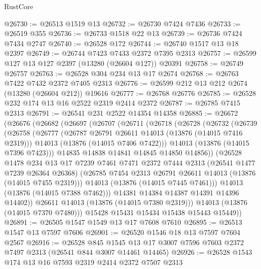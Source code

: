 \begin{lexlean}{RustCore}
\begin{coremodule}
@26730 := @26513 @1519 @13
@26732 := @26730 @7424 @7436
@26733 := @26519 @355
@26736 := @26733 @1518 @22 @13
@26739 := @26736 @7424 @7434 @2747
@26740 := @26528 @172
@26744 := @26740 @1517 @13 @18 @2397
@26749 := @26744 @7423 @7433 @2372 @7395 @2313
@26757 := @26599 @127 @13 @127 @2397 (@13280 (@26604 @127)) @20391
@26758 := @26749 @26757
@26763 := @26528 @304 @234 @13 @17 @2674
@26768 := @26763 @7422 @7432 @2372 @7405 @2313
@26776 := @26599 @212 @13 @212 @2674 (@13280 (@26604 @212)) @19616
@26777 := @26768 @26776
@26785 := @26528 @232 @174 @13 @16 @2522 @2319 @2414 @2372
@26787 := @26785 @7415 @2313
@26791 := @26541 @231 @2522 @14354 @14358
@26885 := @26672
    (@26676
      (@26682
        (@26697
          (@26707
            (@26711
              (@26718
                (@26728
                  (@26732
                    (@26739
                      (@26758
                        (@26777
                          (@26787 @26791 @26611 @14013 (@13876 (@14015 @7416 @2319)))
                          @14013
                          (@13876 (@14015 @7406 @7422)))
                        @14013
                        (@13876 (@14015 @7396 @7423)))
                      @14835
                      @14838
                      @14841
                      @14845
                      @14850
                      @14856))
                  (@26528
                    @1478
                    @234
                    @13
                    @17
                    @7239
                    @7461
                    @7471
                    @2372
                    @7444
                    @2313
                    (@26541 @1477 @7239 @26364 @26368)
                    (@26785 @7454 @2313 @26791 @26611 @14013 (@13876 (@14015 @7455 @2319)))
                    @14013
                    (@13876 (@14015 @7445 @7461)))
                  @14013
                  (@13876 (@14015 @7388 @7462)))
                @14381
                @14384
                @14387
                @14391
                @14396
                @14402))
            @26611
            @14013
            (@13876 (@14015 @7380 @2319)))
          @14013
          (@13876 (@14015 @7370 @7480)))
        @15428
        @15431
        @15434
        @15438
        @15443
        @15449))
@26891 := @26505 @1547 @1549 @13 @17 @7608 @7610
@26895 := @26513 @1547 @13 @7597 @7606
@26901 := @26520 @1546 @18 @13 @7597 @7604 @2567
@26916 := @26528
    @845
    @1545
    @13
    @17
    @3007
    @7596
    @7603
    @2372
    @7497
    @2313
    (@26541 @844 @3007 @14461 @14465)
@26926 := @26528 @1543 @174 @13 @16 @7593 @2319 @2414 @2372 @7507 @2313

\end{coremodule}
\end{lexlean}
